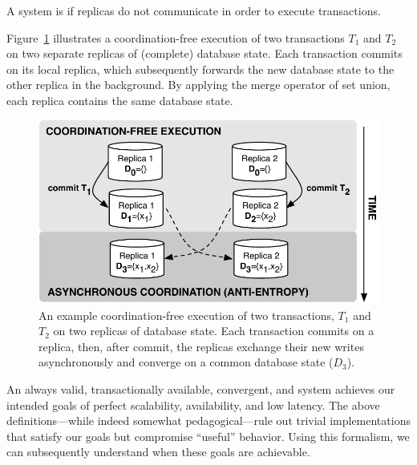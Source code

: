 \begin{definition}
A system is \textit{\cfree} if replicas do not communicate in order to
execute transactions.
\end{definition}

Figure~\ref{fig:replicas} illustrates a coordination-free execution of
two transactions $T_1$ and $T_2$ on two separate replicas of
(complete) database state. Each transaction commits on its local
replica, which subsequently forwards the new database state to the
other replica in the background. By applying the merge operator of set
union, each replica contains the same database state.

\begin{figure}
\begin{center}
\includegraphics[width=.85\columnwidth]{figs/replicas.pdf}
\end{center}\vspace{-1em}
\caption{An example coordination-free execution of two transactions,
  $T_1$ and $T_2$ on two replicas of database state. Each transaction
  commits on a replica, then, after commit, the replicas exchange
  their new writes asynchronously and converge on a common database
  state ($D_3$).}
\label{fig:replicas}
\end{figure}

 An always valid, transactionally available,
convergent, and \cfree system achieves our intended goals of perfect
scalability, availability, and low latency. The above
definitions---while indeed somewhat pedagogical---rule out trivial
implementations that satisfy our goals but compromise ``useful''
behavior. Using this formalism, we can subsequently understand when
these goals are achievable.
